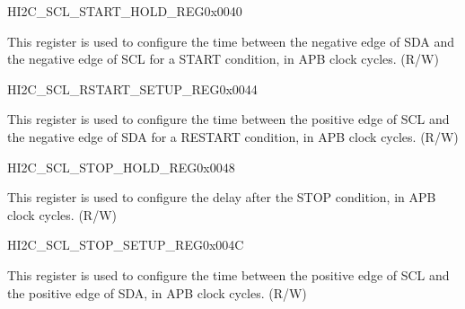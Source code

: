 \documentclass[main.tex]{subfiles}
\begin{document}
\begin{register}{H}{I2C\_SCL\_START\_HOLD\_REG}{0x0040}\label{regdesc:I2CSCLSTARTHOLDREG}
%
%
\regnewline%
\begin{regdesc}\begin{reglist}
\item [I2C\_SCL\_START\_HOLD\_TIME]This register is used to configure the time between the negative edge of SDA and the negative edge of SCL for a START condition, in APB clock cycles. (R/W)
\end{reglist}\end{regdesc}
\end{register}


\begin{register}{H}{I2C\_SCL\_RSTART\_SETUP\_REG}{0x0044}\label{regdesc:I2CSCLRSTARTSETUPREG}
%
%
\regnewline%
\begin{regdesc}\begin{reglist}
\item [I2C\_SCL\_RSTART\_SETUP\_TIME]This register is used to configure the time between the positive edge of SCL and the negative edge of SDA for a RESTART condition, in APB clock cycles. (R/W)
\end{reglist}\end{regdesc}
\end{register}


\begin{register}{H}{I2C\_SCL\_STOP\_HOLD\_REG}{0x0048}\label{regdesc:I2CSCLSTOPHOLDREG}
%
%
\regnewline%
\begin{regdesc}\begin{reglist}
\item [I2C\_SCL\_STOP\_HOLD\_TIME]This register is used to configure the delay after the STOP condition, in APB clock cycles. (R/W)
\end{reglist}\end{regdesc}
\end{register}


\begin{register}{H}{I2C\_SCL\_STOP\_SETUP\_REG}{0x004C}\label{regdesc:I2CSCLSTOPSETUPREG}
%
%
\regnewline%
\begin{regdesc}\begin{reglist}
\item [I2C\_SCL\_STOP\_SETUP\_TIME]This register is used to configure the time between the positive edge of SCL and the positive edge of SDA, in APB clock cycles. (R/W)
\end{reglist}\end{regdesc}
\end{register}
\end{document}

